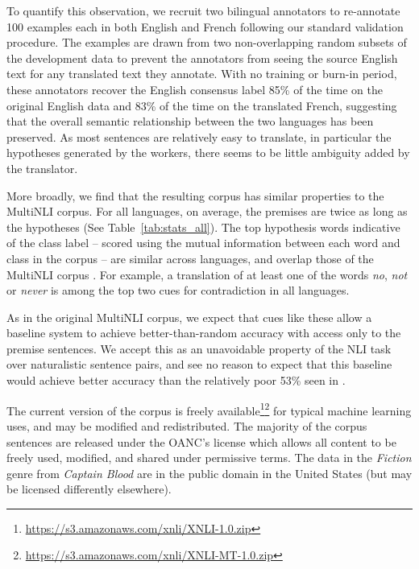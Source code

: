 \documentclass[11pt,a4paper]{article}
\begin{document}
To quantify this observation, we recruit two bilingual annotators to re-annotate 100 examples each in both English and French following our standard validation procedure. The examples are drawn from two non-overlapping random subsets of the development data to prevent the annotators from seeing the source English text for any translated text they annotate. With no training or burn-in period, these annotators recover the English consensus label 85\% of the time on the original English data and 83\% of the time on the translated French, suggesting that the overall semantic relationship between the two languages has been preserved. As most sentences are relatively easy to translate, in particular the hypotheses generated by the workers, there seems to be little ambiguity added by the translator. 

More broadly, we find that the resulting corpus has similar properties to the MultiNLI corpus. For all languages, on average, the premises are twice as long as the hypotheses (See Table~\ref{tab:stats_all}). The top hypothesis words indicative of the class label -- scored using the mutual information between each word and class in the corpus -- are similar across languages, and overlap those of the MultiNLI corpus \cite{gururangan2018annotation}. For example, a translation of at least one of the words {\it no}, {\it not} or {\it never} is among the top two cues for contradiction in all languages.

As in the original MultiNLI corpus, we expect that cues like these \citep[`artifacts', in Gururangan's terms, also observed by ][]{Poliak2018,TSUCHIYA18.786} allow a baseline system to achieve better-than-random accuracy with access only to the premise sentences. We accept this as an unavoidable property of the NLI task over naturalistic sentence pairs, and see no reason to expect that this baseline would achieve better accuracy than the relatively poor 53\% seen in \citet{gururangan2018annotation}.

The current version of the corpus is freely available\footnote{\scriptsize\url{https://s3.amazonaws.com/xnli/XNLI-1.0.zip}}\footnote{\scriptsize\url{https://s3.amazonaws.com/xnli/XNLI-MT-1.0.zip}} for typical machine learning uses, and may be modified and redistributed. The majority of the
corpus sentences are released under the OANC's license which allows all content to be freely used, modified, and shared under permissive terms. The data in the \textit{Fiction} genre from {\it Captain Blood} are in the public domain in the United States (but may be licensed differently elsewhere).
\end{document}
